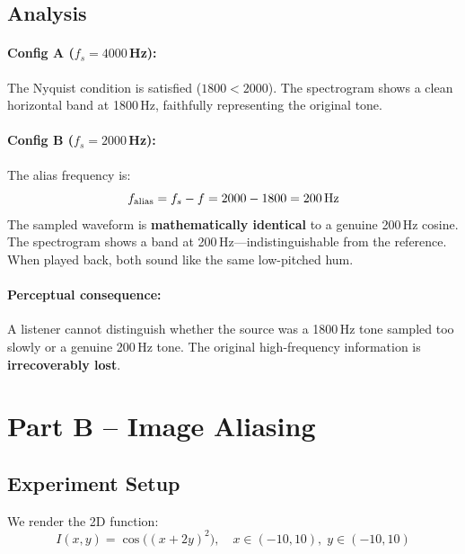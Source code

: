 \documentclass[12pt, a4paper]{article}
\begin{document}
\subsection{Analysis}

\paragraph{Config A ($f_s = 4000$\,Hz):}
The Nyquist condition is satisfied ($1800 < 2000$). The spectrogram shows a clean horizontal band at 1800\,Hz, faithfully representing the original tone.

\paragraph{Config B ($f_s = 2000$\,Hz):}
The alias frequency is:
\begin{equation}
    f_{\text{alias}} = f_s - f = 2000 - 1800 = 200 \text{\,Hz}
\end{equation}
The sampled waveform is \textbf{mathematically identical} to a genuine 200\,Hz cosine. The spectrogram shows a band at 200\,Hz---indistinguishable from the reference. When played back, both sound like the same low-pitched hum.

\paragraph{Perceptual consequence:} A listener cannot distinguish whether the source was a 1800\,Hz tone sampled too slowly or a genuine 200\,Hz tone. The original high-frequency information is \textbf{irrecoverably lost}.

\section{Part B -- Image Aliasing}

\subsection{Experiment Setup}

We render the 2D function:
\begin{equation}
    I(x, y) = \cos\!\Big((x + 2y)^2\Big), \quad x \in (-10, 10), \; y \in (-10, 10)
    \label{eq:chirp}
\end{equation}
\end{document}

